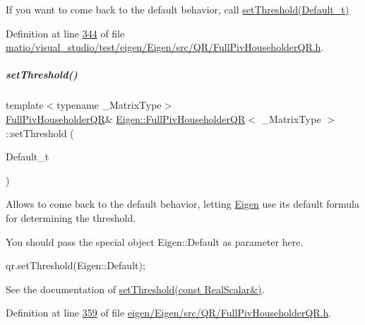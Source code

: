If you want to come back to the default behavior, call \hyperlink{group___q_r___module_aaea4bf3dd145e0cddb16e364cca9d887}{set\+Threshold(\+Default\+\_\+t)} 

Definition at line \hyperlink{matio_2visual__studio_2test_2eigen_2_eigen_2src_2_q_r_2_full_piv_householder_q_r_8h_source_l00344}{344} of file \hyperlink{matio_2visual__studio_2test_2eigen_2_eigen_2src_2_q_r_2_full_piv_householder_q_r_8h_source}{matio/visual\+\_\+studio/test/eigen/\+Eigen/src/\+Q\+R/\+Full\+Piv\+Householder\+Q\+R.\+h}.

\mbox{\label{group___q_r___module_aaea4bf3dd145e0cddb16e364cca9d887}} 
\subparagraph{\texorpdfstring{set\+Threshold()}{setThreshold()}\hspace{0.1cm}{\footnotesize\ttfamily [3/4]}}
{\footnotesize\ttfamily template$<$typename \+\_\+\+Matrix\+Type$>$ \\
\hyperlink{group___q_r___module_class_eigen_1_1_full_piv_householder_q_r}{Full\+Piv\+Householder\+QR}\& \hyperlink{group___q_r___module_class_eigen_1_1_full_piv_householder_q_r}{Eigen\+::\+Full\+Piv\+Householder\+QR}$<$ \+\_\+\+Matrix\+Type $>$\+::set\+Threshold (\begin{DoxyParamCaption}\item[{Default\+\_\+t}]{ }\end{DoxyParamCaption})\hspace{0.3cm}{\ttfamily [inline]}}

Allows to come back to the default behavior, letting \hyperlink{namespace_eigen}{Eigen} use its default formula for determining the threshold.

You should pass the special object Eigen\+::\+Default as parameter here. 
\begin{DoxyCode}
qr.setThreshold(Eigen::Default); 
\end{DoxyCode}


See the documentation of \hyperlink{group___q_r___module_a92277e572bf98245891015d12dd2b602}{set\+Threshold(const Real\+Scalar\&)}. 

Definition at line \hyperlink{eigen_2_eigen_2src_2_q_r_2_full_piv_householder_q_r_8h_source_l00359}{359} of file \hyperlink{eigen_2_eigen_2src_2_q_r_2_full_piv_householder_q_r_8h_source}{eigen/\+Eigen/src/\+Q\+R/\+Full\+Piv\+Householder\+Q\+R.\+h}.

